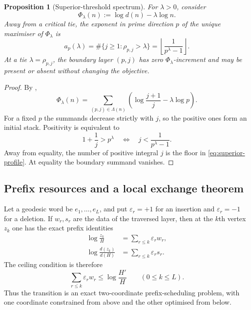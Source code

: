 \documentclass[11pt]{article}
\numberwithin{equation}{section}
\theoremstyle{blueplain}
\newtheorem{proposition}[theorem]{Proposition}
\theoremstyle{bluedef}
\begin{document}
\begin{proposition}[Superior-threshold spectrum]
\label{prop:superior-spectrum}
For $\lambda>0$, consider
\begin{equation}
 \Phi_\lambda(n):=\log d(n)-\lambda\log n.
 \label{eq:phi-lambda}
\end{equation}
Away from a critical tie, the exponent in prime direction $p$ of the unique maximiser of $\Phi_\lambda$ is
\begin{equation}
 a_p(\lambda)
 =\#\{j\ge1:\rho_{p,j}>\lambda\}
 =\left\lfloor\frac{1}{p^\lambda-1}\right\rfloor.
 \label{eq:superior-profile}
\end{equation}
At a tie $\lambda=\rho_{p,j}$, the boundary layer $(p,j)$ has zero $\Phi_\lambda$-increment and may be present or absent without changing the objective.
\end{proposition}

\begin{proof}
By ,
\[
 \Phi_\lambda(n)
 =\sum_{(p,j)\in\Lambda(n)}
 \left(\log\frac{j+1}{j}-\lambda\log p\right).
\]
For a fixed $p$ the summands decrease strictly with $j$, so the positive ones form an initial stack.  Positivity is equivalent to
\[
 1+\frac1j>p^\lambda
 \quad\Longleftrightarrow\quad
 j<\frac{1}{p^\lambda-1}.
\]
Away from equality, the number of positive integral $j$ is the floor in \eqref{eq:superior-profile}.  At equality the boundary summand vanishes.
\end{proof}

\subsection{Prefix resources and a local exchange theorem}

Let a geodesic word be $e_1,\ldots,e_L$, and put $\varepsilon_r=+1$ for an insertion and $\varepsilon_r=-1$ for a deletion.  If $w_r,s_r$ are the data of the traversed layer, then at the $k$th vertex $z_k$ one has the exact prefix identities
\begin{align}
 \log\frac{z_k}{H}
 &=\sum_{r\le k}\varepsilon_r w_r,
 \label{eq:prefix-size}\\
 \log\frac{d(z_k)}{d(H)}
 &=\sum_{r\le k}\varepsilon_r s_r.
 \label{eq:prefix-entropy}
\end{align}
The ceiling condition is therefore
\begin{equation}
 \sum_{r\le k}\varepsilon_r w_r
 \le\log\frac{H'}{H}
 \qquad(0\le k\le L).
 \label{eq:prefix-ceiling}
\end{equation}
Thus the transition is an exact two-coordinate prefix-scheduling problem, with one coordinate constrained from above and the other optimised from below.
\end{document}
